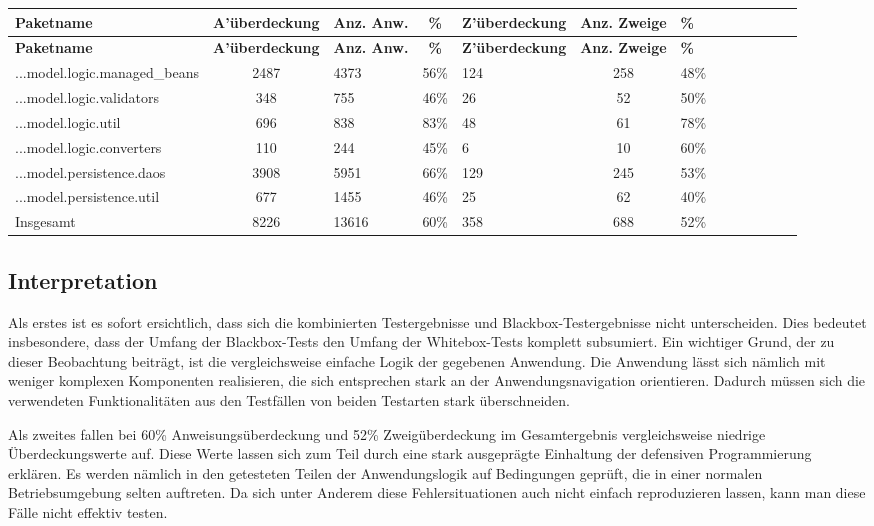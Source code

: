 \documentclass{article}
\begin{document}
\begin{longtable}{@{}lclclclclclcl@{}}
\toprule
\textbf{Paketname} & \textbf{A'überdeckung} & \textbf{Anz. Anw.} & \textbf{\%} & \textbf{Z'überdeckung} & \textbf{Anz. Zweige} & \textbf{\%} \\* \midrule
\endfirsthead
\textbf{Paketname} & \textbf{A'überdeckung} & \textbf{Anz. Anw.} & \textbf{\%} & \textbf{Z'überdeckung} & \textbf{Anz. Zweige} & \textbf{\%} \\* \midrule
\endhead
...model.logic.managed\_beans 	& 2487 		& 4373 		& 56\% 		& 124 		& 258 		& 48\% \\
...model.logic.validators 		& 348 		& 755 		& 46\% 		& 26 			& 52 			& 50\% \\
...model.logic.util 			& 696 		& 838 		& 83\% 		& 48 			& 61 			& 78\% \\
...model.logic.converters 		& 110 		& 244 		& 45\% 		& 6 			& 10 			& 60\% \\
...model.persistence.daos 		& 3908 		& 5951 		& 66\% 		& 129 		& 245 		& 53\% \\
...model.persistence.util 		& 677 		& 1455 		& 46\% 		& 25 			& 62 			& 40\% \\
Insgesamt 						& 8226            	& 13616            & 60\%            	& 358            	& 688            	& 52\% \\* \bottomrule
\end{longtable}

\subsection{Interpretation}

Als erstes ist es sofort ersichtlich, dass sich die kombinierten Testergebnisse und Blackbox-Testergebnisse nicht unterscheiden. 
Dies bedeutet insbesondere, dass der Umfang der Blackbox-Tests den Umfang der Whitebox-Tests komplett subsumiert. 
Ein wichtiger Grund, der zu dieser Beobachtung beiträgt, ist die vergleichsweise einfache Logik der gegebenen Anwendung. 
Die Anwendung lässt sich nämlich mit weniger komplexen Komponenten realisieren, die sich entsprechen stark an der Anwendungsnavigation orientieren. 
Dadurch müssen sich die verwendeten Funktionalitäten aus den Testfällen von beiden Testarten stark überschneiden.

Als zweites fallen bei 60\% Anweisungsüberdeckung und 52\% Zweigüberdeckung im Gesamtergebnis vergleichsweise niedrige Überdeckungswerte auf. 
Diese Werte lassen sich zum Teil durch eine stark ausgeprägte Einhaltung der defensiven Programmierung erklären. 
Es werden nämlich in den getesteten Teilen der Anwendungslogik auf Bedingungen geprüft, die in einer normalen Betriebsumgebung selten auftreten. 
Da sich unter Anderem diese Fehlersituationen auch nicht einfach reproduzieren lassen, kann man diese Fälle nicht effektiv testen. 

\newpage
\end{document}
